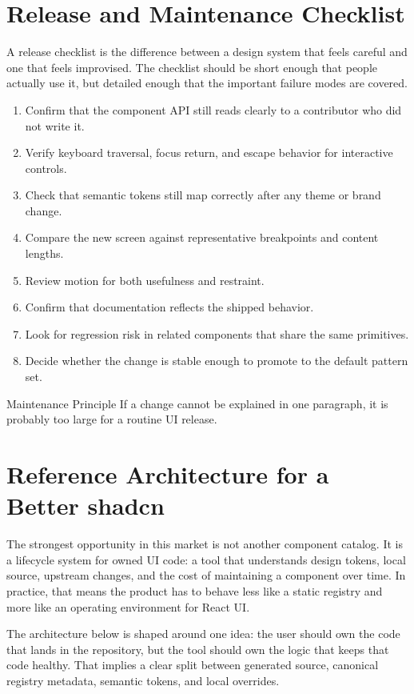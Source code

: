 \documentclass[11pt,twoside,a4paper]{article}
\begin{document}
\section{Release and Maintenance Checklist}
A release checklist is the difference between a design system that feels careful and one that feels improvised. The checklist should be short enough that people actually use it, but detailed enough that the important failure modes are covered.

\begin{enumerate}[leftmargin=*, itemsep=0.45em]
  \item Confirm that the component API still reads clearly to a contributor who did not write it.
  \item Verify keyboard traversal, focus return, and escape behavior for interactive controls.
  \item Check that semantic tokens still map correctly after any theme or brand change.
  \item Compare the new screen against representative breakpoints and content lengths.
  \item Review motion for both usefulness and restraint.
  \item Confirm that documentation reflects the shipped behavior.
  \item Look for regression risk in related components that share the same primitives.
  \item Decide whether the change is stable enough to promote to the default pattern set.
\end{enumerate}

\begin{highlightbox}{Maintenance Principle}
If a change cannot be explained in one paragraph, it is probably too large for a routine UI release.
\end{highlightbox}

\clearpage
\section{Reference Architecture for a Better shadcn}
The strongest opportunity in this market is not another component catalog. It is a lifecycle system for owned UI code: a tool that understands design tokens, local source, upstream changes, and the cost of maintaining a component over time. In practice, that means the product has to behave less like a static registry and more like an operating environment for React UI.

The architecture below is shaped around one idea: the user should own the code that lands in the repository, but the tool should own the logic that keeps that code healthy. That implies a clear split between generated source, canonical registry metadata, semantic tokens, and local overrides.
\end{document}
